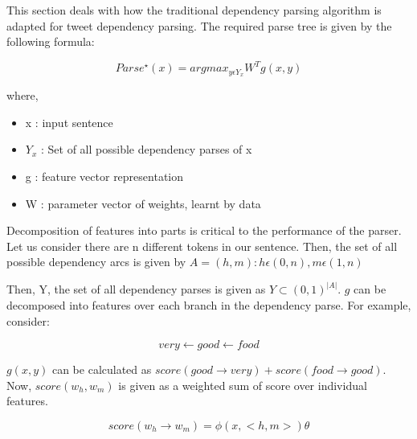 This section deals with how the traditional dependency parsing algorithm is adapted for tweet dependency parsing. 
The required parse tree is given by the following formula:

\begin{framed}
 \begin{equation*}
Parse^\star(x) = argmax_{y \epsilon Y_x} W^T g(x, y)
\end{equation*}
\end{framed}

where, 


\begin{itemize}
\item x : input sentence \\
\item $Y_x$ : Set of all possible dependency parses of x \\
\item g : feature vector representation \\
\item W : parameter vector of weights, learnt by data
\end{itemize}

Decomposition of features into parts is critical to the performance of the parser. Let us consider there are n different tokens in our sentence. Then, the set of all possible dependency
arcs is given by $A = {(h,m) : h  \epsilon (0,n), m  \epsilon (1,n)}$ 

\vspace{8mm}

Then, Y, the set of all dependency parses is given as $Y \subset (0,1)^{|A|}$. $g$ can be decomposed into features over each branch in the dependency parse. For example, consider:
\begin{framed}
 \begin{equation*}
very \leftarrow good \leftarrow food
\end{equation*}
\end{framed}

$g(x,y)$ can be calculated as $score(good \rightarrow very) + score(food \rightarrow good)$. Now, $score(w_h,w_m)$ is given as a weighted sum of score over individual features.

\begin{framed}
 \begin{equation*}
score(w_h \rightarrow w_m) = \phi (x, <h,m>) \theta
\end{equation*}
\end{framed}

